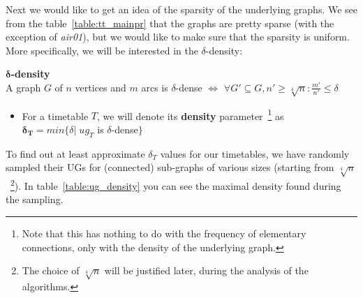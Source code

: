 	Next we would like to get an idea of the sparsity of the underlying graphs. We see from the table~\ref{table:tt_mainpr} that the graphs are pretty sparse (with the exception of \textit{air01}), but we would like to make sure that the sparsity is uniform. More specifically, we will be interested in the $\delta$-density:
	
	\begin{definition}
		\textbf{$\bm{\delta}$-density} \\
		A graph $G$ of $n$ vertices and $m$ arcs is $\delta$-dense $\iff$ $\forall G' \subseteq G, n' \geq \sqrt[4]{n}: \frac{\displaystyle m'}{\displaystyle n'} \leq \delta$
		\begin{itemize}
			\item For a timetable $T$, we will denote its \textbf{density} parameter~\footnote{Note that this has nothing to do with the frequency of elementary connections, only with the density of the underlying graph.} as $\bm{\delta_{T}} = min \{\delta|\; ug_{T}$ is $\delta$-dense$\}$
		\end{itemize}
	\end{definition}
	
	\noindent To find out at least approximate $\delta_{T}$ values for our timetables, we have randomly sampled their UGs for (connected) sub-graphs of various sizes (starting from $\sqrt[4]{n}$~\footnote{The choice of $\sqrt[4]{n}$ will be justified later, during the analysis of the algorithms.}). In table~\ref{table:ug_density} you can see the maximal density found during the sampling. \\
	
